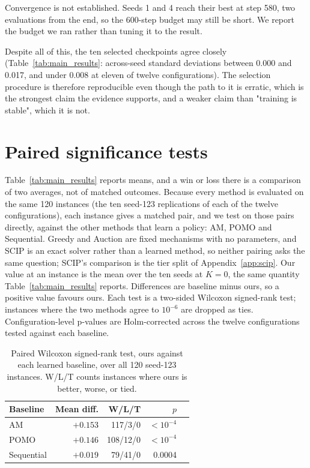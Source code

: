 Convergence is not established. Seeds 1 and 4 reach their best at step 580,
two evaluations from the end, so the 600-step budget may still be short. We
report the budget we ran rather than tuning it to the result.

Despite all of this, the ten selected checkpoints agree closely
(Table~\ref{tab:main_results}: across-seed standard deviations between 0.000
and 0.017, and under 0.008 at eleven of twelve configurations). The selection
procedure is therefore reproducible even though the path to it is erratic,
which is the strongest claim the evidence supports, and a weaker claim than
"training is stable", which it is not.

\section{Paired significance tests}
\label{app:paired}

Table~\ref{tab:main_results} reports means, and a win or loss there is a
comparison of two averages, not of matched outcomes. Because every method is
evaluated on the same 120 instances (the ten seed-123 replications of each of
the twelve configurations), each instance gives a matched pair, and we test on
those pairs directly, against the other methods that learn a policy: AM,
POMO and Sequential. Greedy and Auction are fixed mechanisms with no
parameters, and SCIP is an exact solver rather than a learned method, so
neither pairing asks the same question; SCIP's comparison is the tier split
of Appendix~\ref{app:scip}. Our value at an instance is the mean over the ten
seeds at $K{=}0$, the same quantity Table~\ref{tab:main_results} reports.
Differences are baseline minus ours, so a positive value favours ours. Each
test is a two-sided Wilcoxon signed-rank test; instances where the two
methods agree to $10^{-6}$ are dropped as ties. Configuration-level p-values
are Holm-corrected across the twelve configurations tested against each
baseline.

\begin{table}[htbp]
\centering
\small
\caption{Paired Wilcoxon signed-rank test, ours against each learned baseline,
over all 120 seed-123 instances. W/L/T counts instances where ours is better,
worse, or tied.}
\label{tab:paired-overall}
\begin{tabular}{@{}lrrrr@{}}
\toprule
Baseline & Mean diff. & W/L/T & $p$ \\
\midrule
AM          & $+0.153$ & 117/3/0  & $<10^{-4}$ \\
POMO        & $+0.146$ & 108/12/0 & $<10^{-4}$ \\
Sequential  & $+0.019$ & 79/41/0  & 0.0004 \\
\bottomrule
\end{tabular}
\end{table}

